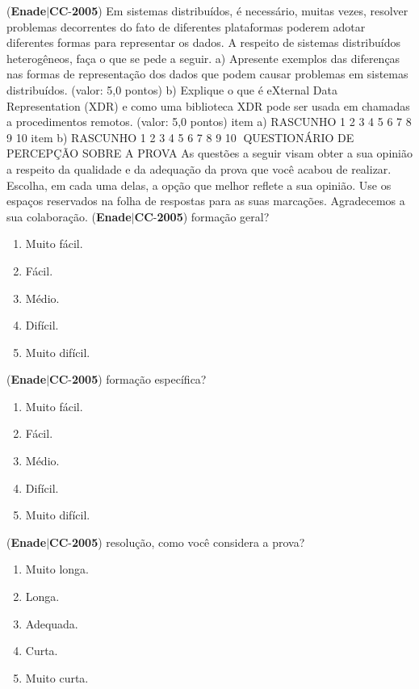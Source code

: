 \documentclass{exam}
\begin{document}
\begin{questions}
\begin{enumerate}[label=\alph*)]
	\end{enumerate}

\question (\textbf{Enade}$|$\textbf{CC}-\textbf{2005}) Em sistemas distribuídos, é necessário, muitas vezes, resolver problemas decorrentes do fato de diferentes plataformas
poderem adotar diferentes formas para representar os dados.
A respeito de sistemas distribuídos heterogêneos, faça o que se pede a seguir.
a) Apresente exemplos das diferenças nas formas de representação dos dados que podem causar problemas em sistemas distribuídos.
(valor: 5,0 pontos)
b) Explique o que é eXternal Data Representation (XDR) e como uma biblioteca XDR pode ser usada em chamadas a procedimentos
remotos. (valor: 5,0 pontos)
item a) RASCUNHO
1
2
3
4
5
6
7
8
9
10
item b) RASCUNHO
1
2
3
4
5
6
7
8
9
10
QUESTIONÁRIO DE PERCEPÇÃO SOBRE A PROVA
As questões a seguir visam obter a sua opinião a respeito da qualidade e da adequação da prova que você acabou
de realizar. Escolha, em cada uma delas, a opção que melhor reflete a sua opinião. Use os espaços reservados na folha
de respostas para as suas marcações.
Agradecemos a sua colaboração.
\question (\textbf{Enade}$|$\textbf{CC}-\textbf{2005}) formação geral?
	\begin{enumerate}[label=\alph*)]
		\item  Muito fácil.
		\item  Fácil.
		\item  Médio.
		\item  Difícil.
		\item  Muito difícil.

	\end{enumerate}

\question (\textbf{Enade}$|$\textbf{CC}-\textbf{2005}) formação específica?
	\begin{enumerate}[label=\alph*)]
		\item  Muito fácil.
		\item  Fácil.
		\item  Médio.
		\item  Difícil.
		\item  Muito difícil.

	\end{enumerate}

\question (\textbf{Enade}$|$\textbf{CC}-\textbf{2005}) resolução, como você considera a prova?
	\begin{enumerate}[label=\alph*)]
		\item  Muito longa.
		\item  Longa.
		\item  Adequada.
		\item  Curta.
		\item  Muito curta.


\end{enumerate}
\end{questions}
\end{document}
